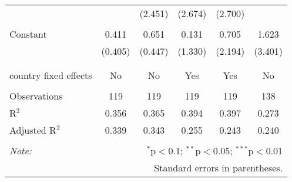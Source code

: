 \begin{tabular}{@{\extracolsep{5pt}}lccccc}
  &  & (2.451) & (2.674) & (2.700) &  \\ 
  & & & & & \\ 
 Constant & 0.411 & 0.651 & 0.131 & 0.705 & 1.623 \\ 
  & (0.405) & (0.447) & (1.330) & (2.194) & (3.401) \\ 
  & & & & & \\ 
\hline \\[-1.8ex] 
country fixed effects & No & No & Yes & Yes & No \\ 
\hline \\[-1.8ex] 
Observations & 119 & 119 & 119 & 119 & 138 \\ 
R$^{2}$ & 0.356 & 0.365 & 0.394 & 0.397 & 0.273 \\ 
Adjusted R$^{2}$ & 0.339 & 0.343 & 0.255 & 0.243 & 0.240 \\ 
\hline 
\hline \\[-1.8ex] 
\textit{Note:}  & \multicolumn{5}{r}{$^{*}$p$<$0.1; $^{**}$p$<$0.05; $^{***}$p$<$0.01} \\ 
 & \multicolumn{5}{r}{Standard errors in parentheses.} \\ 
\end{tabular} 
\endgroup 
